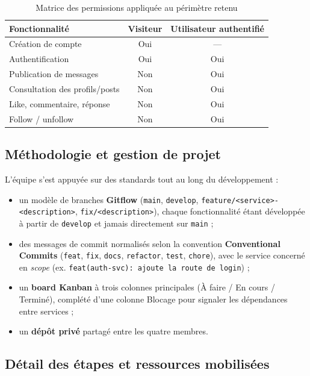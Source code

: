 \documentclass{cesi}
\begin{document}
\begin{table}[H]
\centering
\begin{tabularx}{\linewidth}{X c c}
\toprule
\textbf{Fonctionnalité} & \textbf{Visiteur} & \textbf{Utilisateur authentifié} \\
\midrule
Création de compte               & Oui & --- \\
Authentification                  & Oui & Oui \\
Publication de messages           & Non & Oui \\
Consultation des profils/posts    & Non & Oui \\
Like, commentaire, réponse        & Non & Oui \\
Follow / unfollow                 & Non & Oui \\
\bottomrule
\end{tabularx}
\caption{Matrice des permissions appliquée au périmètre retenu}
\end{table}

\subsection{Méthodologie et gestion de projet}

L'équipe s'est appuyée sur des standards tout au long du développement :

\begin{itemize}
  \item un modèle de branches \textbf{Gitflow} (\texttt{main}, \texttt{develop},
        \texttt{feature/<service>-<description>}, \texttt{fix/<description>}),
        chaque fonctionnalité étant développée à partir de \texttt{develop} et jamais
        directement sur \texttt{main} ;
  \item des messages de commit normalisés selon la convention
        \textbf{Conventional Commits} (\texttt{feat}, \texttt{fix}, \texttt{docs},
        \texttt{refactor}, \texttt{test}, \texttt{chore}), avec le service concerné en
        \emph{scope} (ex. \texttt{feat(auth-svc): ajoute la route de login}) ;
  \item un \textbf{board Kanban} à trois colonnes principales
        (À faire / En cours / Terminé), complété d'une colonne Blocage pour signaler
        les dépendances entre services ;
  \item un \textbf{dépôt privé} partagé entre les quatre membres.
\end{itemize}

\subsection{Détail des étapes et ressources mobilisées}
\end{document}
